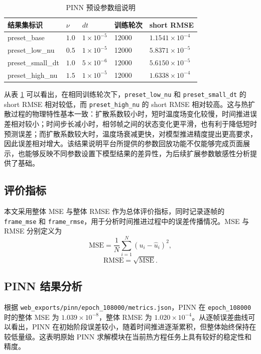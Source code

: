 \documentclass[UTF8,zihao=-4]{oucart}
\begin{document}
\begin{table}[H]
  \centering
  \caption{PINN 预设参数组说明}
  \label{tab:preset}
  \begin{tabular}{lllll}
    \toprule
    结果集标识 & $\nu$ & $dt$ & 训练轮次 & short RMSE \\
    \midrule
    preset\_base & $1.0$ & $1\times10^{-5}$ & 12000 & $1.1541\times10^{-4}$ \\
    preset\_low\_nu & $0.5$ & $1\times10^{-5}$ & 12000 & $5.8371\times10^{-5}$ \\
    preset\_small\_dt & $1.0$ & $5\times10^{-6}$ & 12000 & $5.6150\times10^{-5}$ \\
    preset\_high\_nu & $1.5$ & $1\times10^{-5}$ & 12000 & $1.6338\times10^{-4}$ \\
    \bottomrule
  \end{tabular}
\end{table}

从表 \ref{tab:preset} 可以看出，在相同训练轮次下，\texttt{preset\_low\_nu} 和 \texttt{preset\_small\_dt} 的 short RMSE 相对较低，而 \texttt{preset\_high\_nu} 的 short RMSE 相对较高。这与热扩散过程的物理特性基本一致：扩散系数较小时，短时温度场变化较慢，时间推进误差相对较小；时间步长减小时，相邻帧之间的状态变化更平滑，也有利于降低短时预测误差；而扩散系数较大时，温度场衰减更快，对模型推进精度提出更高要求，因此误差相对增大。该结果说明平台所提供的参数回放功能不仅能够完成页面展示，也能够反映不同参数设置下模型结果的差异性，为后续扩展参数敏感性分析提供了基础。

\subsection{评价指标}

本文采用整体 MSE 与整体 RMSE 作为总体评价指标，同时记录逐帧的 \texttt{frame\_mse} 和 \texttt{frame\_rmse}，用于分析时间推进过程中的误差传播情况。MSE 与 RMSE 分别定义为
\begin{equation}
\mathrm{MSE}=\frac{1}{N}\sum_{i=1}^{N}(u_i-\hat{u}_i)^2,
\end{equation}
\begin{equation}
\mathrm{RMSE}=\sqrt{\mathrm{MSE}}.
\end{equation}

\subsection{PINN 结果分析}

根据 \texttt{web\_exports/pinn/epoch\_108000/metrics.json}，PINN 在 \texttt{epoch\_108000} 时的整体 MSE 为 $1.039\times10^{-8}$，整体 RMSE 为 $1.020\times10^{-4}$。从逐帧误差曲线可以看出，PINN 在初始阶段误差较小，随着时间推进逐渐累积，但整体始终保持在较低量级。这表明原始 PINN 求解模块在当前热方程任务上具有较好的稳定性和精度。
\end{document}
